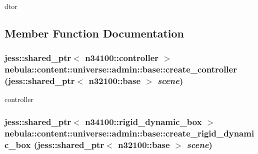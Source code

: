 dtor 

\subsection{Member Function Documentation}
\hypertarget{classnebula_1_1content_1_1universe_1_1admin_1_1base_aca835d45e63a0f069a10695ca3c7d2b1}{
\subsubsection[{create\_\-controller}]{\setlength{\rightskip}{0pt plus 5cm}jess::shared\_\-ptr$<$ {\bf n34100::controller} $>$ nebula::content::universe::admin::base::create\_\-controller (jess::shared\_\-ptr$<$ {\bf n32100::base} $>$ {\em scene})}}
\label{classnebula_1_1content_1_1universe_1_1admin_1_1base_aca835d45e63a0f069a10695ca3c7d2b1}


controller \hypertarget{classnebula_1_1content_1_1universe_1_1admin_1_1base_ac5eb6106c17dd1fd16ecf209ada51edf}{
\subsubsection[{create\_\-rigid\_\-dynamic\_\-box}]{\setlength{\rightskip}{0pt plus 5cm}jess::shared\_\-ptr$<$ {\bf n34100::rigid\_\-dynamic\_\-box} $>$ nebula::content::universe::admin::base::create\_\-rigid\_\-dynamic\_\-box (jess::shared\_\-ptr$<$ {\bf n32100::base} $>$ {\em scene})}}
\label{classnebula_1_1content_1_1universe_1_1admin_1_1base_ac5eb6106c17dd1fd16ecf209ada51edf}


